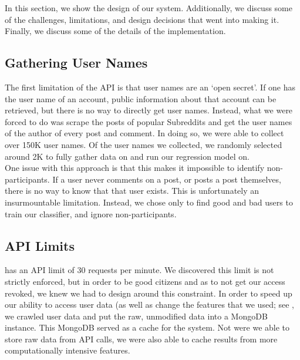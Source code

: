 In this section, we show the design of our system. Additionally, we discuss some
of the challenges, limitations, and design decisions that went into making it.
Finally, we discuss some of the details of the implementation.

\subsection{Gathering \reddit User Names} %
\label{sub:gathering_reddit_user_names}

The first limitation of the \reddit API is that user names are an `open secret'.
If one has the user name of an account, public information about that account
can be retrieved, but there is no way to directly get user names. Instead, what
we were forced to do was scrape the posts of popular Subreddits and get the user
names of the author of every post and comment. In doing so, we were able to
collect over 150K user names. Of the user names we collected, we randomly
selected around 2K to fully gather data on and run our regression model on.
\\
One issue with this approach is that this makes it impossible to identify non-
participants. If a user never comments on a post, or posts a post themselves,
there is no way to know that that user exists. This is unfortunately an
insurmountable limitation. Instead, we chose only to find good and bad users to
train our classifier, and ignore non-participants.


\subsection{\reddit API Limits} %
\label{sub:reddit_api_limits}

\reddit has an API limit of 30 requests per minute. We discovered this limit is
not strictly enforced, but in order to be good citizens and as to not get our
access revoked, we knew we had to design around this constraint. In order to
speed up our ability to access user data (as well as change the features that we
used; see , we crawled user data and put the
raw, unmodified data into a MongoDB instance. This MongoDB served as a cache for
the system. Not were we able to store raw data from \reddit API calls, we were
also able to cache results from more computationally intensive features.


